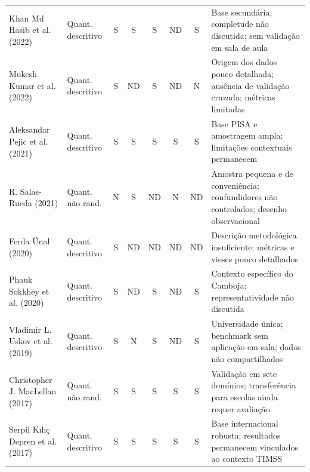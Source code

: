 \begin{longtable}{|p{2.8cm}|p{2.8cm}|ccccc|p{13.0cm}|}
Khan Md Hasib et al. (2022) & Quant. descritivo & S & S & S & ND & S & Base secundária; completude não discutida; sem validação em sala de aula \\
Mukesh Kumar et al. (2022) & Quant. descritivo & S & ND & S & ND & N & Origem dos dados pouco detalhada; ausência de validação cruzada; métricas limitadas \\
Aleksandar Pejic et al. (2021) & Quant. descritivo & S & S & S & S & S & Base PISA e amostragem ampla; limitações contextuais permanecem \\
R. Salas-Rueda (2021) & Quant. não rand. & N & S & ND & N & ND & Amostra pequena e de conveniência; confundidores não controlados; desenho observacional \\
Ferda Ünal (2020) & Quant. descritivo & S & ND & ND & ND & ND & Descrição metodológica insuficiente; métricas e vieses pouco detalhados \\
Phauk Sokkhey et al. (2020) & Quant. descritivo & S & ND & S & ND & S & Contexto específico do Camboja; representatividade não discutida \\
Vladimir L. Uskov et al. (2019) & Quant. descritivo & S & N & S & ND & S & Universidade única; benchmark sem aplicação em sala; dados não compartilhados \\
Christopher J. MacLellan (2017) & Quant. não rand. & S & S & S & S & S & Validação em sete domínios; transferência para escolas ainda requer avaliação \\
Serpil Kılıç Depren et al. (2017) & Quant. descritivo & S & S & S & S & S & Base internacional robusta; resultados permanecem vinculados ao contexto TIMSS \\
\end{longtable}
